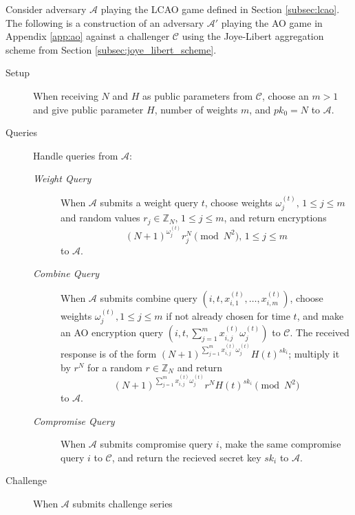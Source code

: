 \documentclass[twocolumn]{autart}
\theoremstyle{definition}
\theoremstyle{remark}
\begin{document}
\begin{pf}
    Consider adversary $\mathcal{A}$ playing the LCAO game defined in Section \ref{subsec:lcao}. The following is a construction of an adversary $\mathcal{A}'$ playing the AO game in Appendix \ref{app:ao} against a challenger $\mathcal{C}$ using the Joye-Libert aggregation scheme from Section \ref{subsec:joye_libert_scheme}.
    \begin{description}
        \item[Setup] When receiving $N$ and $H$ as public parameters from $\mathcal{C}$, choose an $m>1$ and give public parameter $H$, number of weights $m$, and $pk_0=N$ to $\mathcal{A}$.
        \item[Queries] Handle queries from $\mathcal{A}$:
        \begin{description}
            \item[\textit{Weight Query}] When $\mathcal{A}$ submits a weight query $t$, choose weights $\omega^{(t)}_j,\,1 \leq j \leq m$ and random values $r_j \in \mathbb{Z}_N,\,1 \leq j \leq m$, and return encryptions 
            \begin{equation*}
                (N+1)^{\omega^{(t)}_{j}}r_j^N\pmod{N^2},\,1\leq j\leq m
            \end{equation*}
            to $\mathcal{A}$.
            \item[\textit{Combine Query}] When $\mathcal{A}$ submits combine query $(i, t, x^{(t)}_{i,1},\dots,x^{(t)}_{i,m})$, choose weights $\omega^{(t)}_j,1 \leq j \leq m$ if not already chosen for time $t$, and make an AO encryption query $(i, t, \sum^m_{j=1}x^{(t)}_{i,j}\omega^{(t)}_j)$ to $\mathcal{C}$. The received response is of the form $(N+1)^{\sum^m_{j=1}x^{(t)}_{i,j}\omega^{(t)}_j}H(t)^{sk_i}$; multiply it by $r^N$ for a random $r \in \mathbb{Z}_N$ and return 
            \begin{equation*}
                (N+1)^{\sum^m_{j=1}x^{(t)}_{i,j}\omega^{(t)}_j}r^N H(t)^{sk_i} \pmod{N^2}
            \end{equation*}
            to $\mathcal{A}$.
            \item[\textit{Compromise Query}] When $\mathcal{A}$ submits compromise query $i$, make the same compromise query $i$ to $\mathcal{C}$, and return the recieved secret key $sk_i$ to $\mathcal{A}$.
        \end{description}
        \item[Challenge] When $\mathcal{A}$ submits challenge series
        \begin{equation*}

\end{equation*}
\end{description}
\end{pf}
\end{document}
